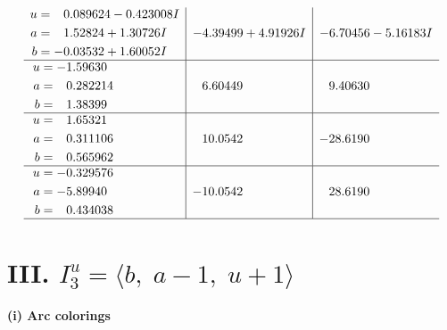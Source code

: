 \documentclass[1p]{elsarticle_modified}
\theoremstyle{definition}
\begin{document}
$$\begin{array}{c|c|c}
\begin{aligned}
u &= \phantom{-}0.089624 - 0.423008 I \\
a &= \phantom{-}1.52824 + 1.30726 I \\
b &= -0.03532 + 1.60052 I\end{aligned}
 & -4.39499 + 4.91926 I & -6.70456 - 5.16183 I \\ \hline\begin{aligned}
u &= -1.59630\phantom{ +0.000000I} \\
a &= \phantom{-}0.282214\phantom{ +0.000000I} \\
b &= \phantom{-}1.38399\phantom{ +0.000000I}\end{aligned}
 & \phantom{-}6.60449\phantom{ +0.000000I} & \phantom{-}9.40630\phantom{ +0.000000I} \\ \hline\begin{aligned}
u &= \phantom{-}1.65321\phantom{ +0.000000I} \\
a &= \phantom{-}0.311106\phantom{ +0.000000I} \\
b &= \phantom{-}0.565962\phantom{ +0.000000I}\end{aligned}
 & \phantom{-}10.0542\phantom{ +0.000000I} & -28.6190\phantom{ +0.000000I} \\ \hline\begin{aligned}
u &= -0.329576\phantom{ +0.000000I} \\
a &= -5.89940\phantom{ +0.000000I} \\
b &= \phantom{-}0.434038\phantom{ +0.000000I}\end{aligned}
 & -10.0542\phantom{ +0.000000I} & \phantom{-}28.6190\phantom{ +0.000000I}\\
 \hline 
 \end{array}$$\newpage\newpage\renewcommand{\arraystretch}{1}
\centering \section*{III. $I^u_{3}= \langle b,\;a-1,\;u+1 \rangle$}
\flushleft \textbf{(i) Arc colorings}\\
\end{document}
